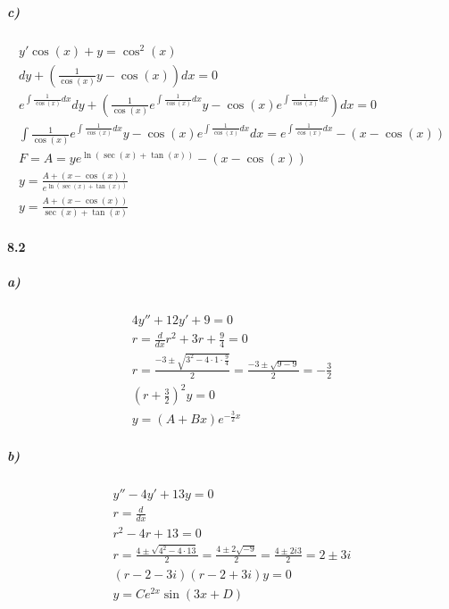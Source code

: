 \documentclass[11pt, A4paper,norsk]{article}
\begin{document}
			\subparagraph{c)}
				\begin{gather*}
y' \cos(x) + y = \cos^2(x) \\
dy + (\frac{1}{\cos(x)} y - \cos(x)) dx = 0 \\
e^{\int \frac{1}{\cos(x)} dx} dy + \left( \frac{1}{\cos(x)} e^{\int \frac{1}{\cos(x)} dx} y - \cos(x) e^{\int \frac{1}{\cos(x)} dx} \right) dx = 0 \\
\int \frac{1}{\cos(x)} e^{\int \frac{1}{\cos(x)} dx} y - \cos(x) e^{\int \frac{1}{\cos(x)} dx} dx = e^{\int \frac{1}{\cos(x)} dx} - (x - \cos(x)) \\
F = A = y e^{\ln( \sec(x) + \tan(x) )} - (x - \cos(x)) \\
y = \frac{A + (x - \cos(x))}{e^{\ln( \sec(x) + \tan(x) )}} \\
y = \frac{A + (x - \cos(x))}{\sec(x) + \tan(x)}
				\end{gather*}
			








		\paragraph{8.2}
			\subparagraph{a)}
				\begin{gather*}
4y'' + 12y' + 9 = 0 \\
r = \frac{d}{dx}
r^2 + 3 r + \frac{9}{4} = 0 \\
r = \frac{- 3 \pm \sqrt{3^2 - 4 \cdot 1 \cdot \frac{9}{4}}}{2} = \frac{-3 \pm \sqrt{9 - 9}}{2} = - \frac{3}{2} \\
\left( r + \frac{3}{2} \right)^2y = 0 \\
y = ( A + Bx ) e^{- \frac{3}{2} x}
				\end{gather*}










			\subparagraph{b)}
				\begin{gather*}
y'' - 4y' + 13y = 0 \\
r = \frac{d}{dx} \\
r^2 - 4r + 13 = 0 \\
r = \frac{4 \pm \sqrt{4^2 - 4 \cdot 13}}{2} = \frac{4 \pm 2 \sqrt{-9}}{2} = \frac{4 \pm 2i3}{2} = 2 \pm 3i \\
(r - 2 - 3i)(r - 2 + 3i)y = 0 \\
y =C  e^{2 x} \sin(3 x + D)
				\end{gather*}
\end{document}
